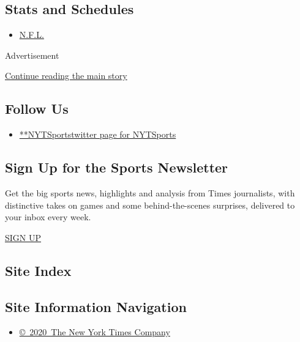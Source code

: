 \hypertarget{stats-and-schedules}{%
\subsection{Stats and Schedules}\label{stats-and-schedules}}

\begin{itemize}
\tightlist
\item
  \protect\hyperlink{}{N.F.L.}
\end{itemize}

Advertisement

\protect\hyperlink{after-mktg}{Continue reading the main story}

\hypertarget{follow-us}{%
\subsection{Follow Us}\label{follow-us}}

\begin{itemize}
\tightlist
\item
  \href{https://twitter.com/NYTSports}{**NYTSportstwitter page for
  NYTSports}
\end{itemize}

\hypertarget{sign-up-for-the-sports-newsletter}{%
\subsection{Sign Up for the Sports
Newsletter}\label{sign-up-for-the-sports-newsletter}}

Get the big sports news, highlights and analysis from Times journalists,
with distinctive takes on games and some behind-the-scenes surprises,
delivered to your inbox every week.

\href{/newsletters/signup/SP}{SIGN UP}

\hypertarget{site-index}{%
\subsection{Site Index}\label{site-index}}

\hypertarget{site-information-navigation}{%
\subsection{Site Information
Navigation}\label{site-information-navigation}}

\begin{itemize}
\tightlist
\item
  \href{https://help.nytimes3xbfgragh.onion/hc/en-us/articles/115014792127-Copyright-notice}{©~2020~The
  New York Times Company}
\end{itemize}

